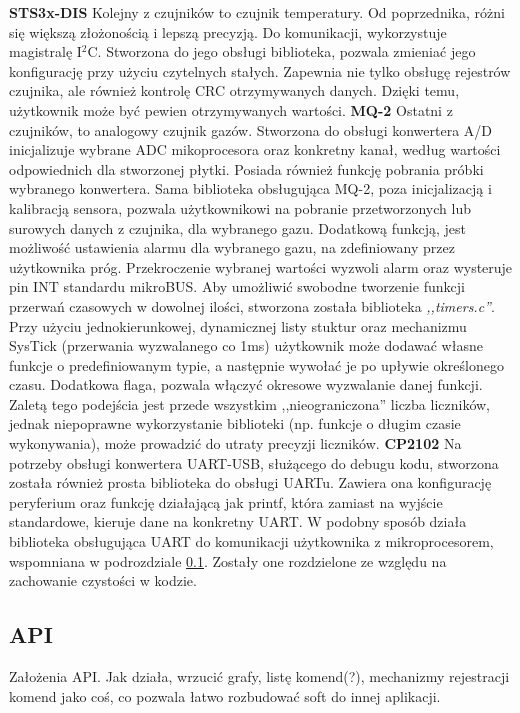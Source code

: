 \textbf{STS3x-DIS}
\newline
Kolejny z czujników to czujnik temperatury. Od poprzednika, różni się większą złożonością i lepszą precyzją. Do komunikacji, wykorzystuje magistralę I$^2$C. Stworzona do jego obsługi biblioteka, pozwala zmieniać jego konfigurację przy użyciu czytelnych stałych. Zapewnia nie tylko obsługę rejestrów czujnika, ale również kontrolę CRC otrzymywanych danych. Dzięki temu, użytkownik może być pewien otrzymywanych wartości.
\newline
\newline
\textbf{MQ-2}
\newline
Ostatni z czujników, to analogowy czujnik gazów. Stworzona do obsługi konwertera A/D inicjalizuje wybrane ADC mikoprocesora oraz konkretny kanał, według wartości odpowiednich dla stworzonej płytki. Posiada również funkcję pobrania próbki wybranego konwertera. Sama biblioteka obsługująca MQ-2, poza inicjalizacją i kalibracją sensora, pozwala użytkownikowi na pobranie przetworzonych lub surowych danych z czujnika, dla wybranego gazu. Dodatkową funkcją, jest możliwość ustawienia alarmu dla wybranego gazu, na zdefiniowany przez użytkownika próg. Przekroczenie wybranej wartości wyzwoli alarm oraz wysteruje pin INT standardu mikroBUS\texttrademark. Aby umożliwić swobodne tworzenie funkcji przerwań czasowych w dowolnej ilości, stworzona została biblioteka \textit{,,timers.c''}. Przy użyciu jednokierunkowej, dynamicznej listy stuktur oraz mechanizmu SysTick (przerwania wyzwalanego co 1ms) użytkownik może dodawać własne funkcje o predefiniowanym typie, a następnie wywołać je po upływie określonego czasu. Dodatkowa flaga, pozwala włączyć okresowe wyzwalanie danej funkcji. Zaletą tego podejścia jest przede wszystkim ,,nieograniczona'' liczba liczników, jednak niepoprawne wykorzystanie biblioteki (np. funkcje o długim czasie wykonywania), może prowadzić do utraty precyzji liczników.
\newline
\newline
\textbf{CP2102}
\newline
Na potrzeby obsługi konwertera UART-USB, służącego do debugu kodu, stworzona została również prosta biblioteka do obsługi UARTu. Zawiera ona konfigurację peryferium oraz funkcję działającą jak printf, która zamiast na wyjście standardowe, kieruje dane na konkretny UART. W podobny sposób działa biblioteka obsługująca UART do komunikacji użytkownika z mikroprocesorem, wspomniana w podrozdziale \ref{sub:api}. Zostały one rozdzielone ze względu na zachowanie czystości w kodzie.
\subsection{API}
\label{sub:api}
Założenia API. Jak działa, wrzucić grafy, listę komend(?), mechanizmy rejestracji komend jako coś, co pozwala łatwo rozbudować soft do innej aplikacji.


